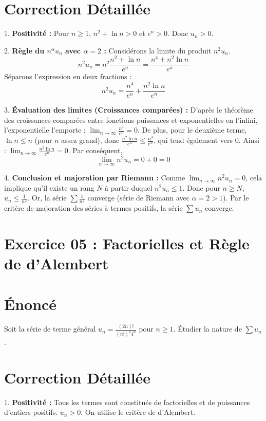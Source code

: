 \documentclass[12pt, a4paper]{article}
\begin{document}
\section{Correction Détaillée}
1. \textbf{Positivité :}
   Pour $n \ge 1$, $n^2 + \ln n > 0$ et $e^n > 0$. Donc $u_n > 0$.

2. \textbf{Règle du $n^\alpha u_n$ avec $\alpha = 2$ :}
   Considérons la limite du produit $n^2 u_n$.
   $$n^2 u_n = n^2 \frac{n^2 + \ln n}{e^n} = \frac{n^4 + n^2 \ln n}{e^n}$$
   Séparons l'expression en deux fractions :
   $$n^2 u_n = \frac{n^4}{e^n} + \frac{n^2 \ln n}{e^n}$$

3. \textbf{Évaluation des limites (Croissances comparées) :}
   D'après le théorème des croissances comparées entre fonctions puissances et exponentielles en l'infini, l'exponentielle l'emporte :
   $\lim_{n \to \infty} \frac{n^4}{e^n} = 0$.
   De plus, pour le deuxième terme, $\ln n \le n$ (pour $n$ assez grand), donc $\frac{n^2 \ln n}{e^n} \le \frac{n^3}{e^n}$, qui tend également vers $0$. Ainsi :
   $\lim_{n \to \infty} \frac{n^2 \ln n}{e^n} = 0$.
   Par conséquent,
   $$\lim_{n \to \infty} n^2 u_n = 0 + 0 = 0$$

4. \textbf{Conclusion et majoration par Riemann :}
   Comme $\lim_{n \to \infty} n^2 u_n = 0$, cela implique qu'il existe un rang $N$ à partir duquel $n^2 u_n \le 1$.
   Donc pour $n \ge N$, $u_n \le \frac{1}{n^2}$.
   Or, la série $\sum \frac{1}{n^2}$ converge (série de Riemann avec $\alpha = 2 > 1$).
   Par le critère de majoration des séries à termes positifs, la série $\sum u_n$ converge.


\section*{Exercice 05 : Factorielles et Règle de d'Alembert}

\section{Énoncé}
Soit la série de terme général $u_n = \frac{(2n)!}{(n!)^2 4^n}$ pour $n \ge 1$.
Étudier la nature de $\sum u_n$.

\section{Correction Détaillée}
1. \textbf{Positivité :}
   Tous les termes sont constitués de factorielles et de puissances d'entiers positifs. $u_n > 0$. On utilise le critère de d'Alembert.
\end{document}
